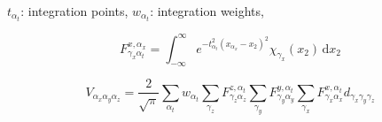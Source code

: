 $t_{\alpha_t}$: integration points, $w_{\alpha_t}$: integration weights, 


\begin{equation}
F_{\gamma_x \alpha_t}^{x,\alpha_x} = \int_{-\infty}^{\infty}
e^{-t^2_{\alpha_t} (x_{\alpha_x} - x_2)^2} \chi_{\gamma_x}(x_2)\,\mathrm{d}x_2
\end{equation}

\begin{equation}
V_{\alpha_x \alpha_y \alpha_z} = \frac{2}{\sqrt{\pi}} \sum_{\alpha_t} w_{\alpha_t}
\sum_{\gamma_z} F_{\gamma_z \alpha_z}^{z,\alpha_t}
\sum_{\gamma_y} F_{\gamma_y \alpha_y}^{y,\alpha_t}
\sum_{\gamma_x} F_{\gamma_x \alpha_x}^{x,\alpha_t}
d_{\gamma_x \gamma_y \gamma_z}
\end{equation}